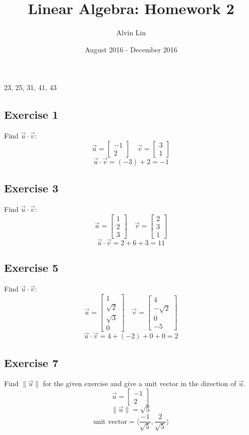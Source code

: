 \documentclass[letterpaper, 12pt]{math}
\title{Linear Algebra: Homework 2}
\author{Alvin Lin}
\date{August 2016 - December 2016}
\begin{document}
\maketitle

23, 25, 31, 41, 43

\subsection*{Exercise 1}
Find \( \vec{u}\cdot\vec{v} \):
\[ \vec{u} = \begin{bmatrix}-1 \\ 2\end{bmatrix} \quad
  \vec{v} = \begin{bmatrix}3 \\ 1\end{bmatrix} \]
\[ \vec{u}\cdot\vec{v} = (-3)+2 = -1 \]

\subsection*{Exercise 3}
Find \( \vec{u}\cdot\vec{v} \):
\[ \vec{u} = \begin{bmatrix}1 \\ 2 \\ 3\end{bmatrix} \quad
  \vec{v} = \begin{bmatrix}2 \\ 3 \\ 1\end{bmatrix} \]
\[ \vec{u}\cdot\vec{v} = 2+6+3 = 11 \]

\subsection*{Exercise 5}
Find \( \vec{u}\cdot\vec{v} \):
\[ \vec{u} = \begin{bmatrix}1 \\ \sqrt{2} \\ \sqrt{3} \\ 0\end{bmatrix} \quad
  \vec{v} = \begin{bmatrix}4 \\ -\sqrt{2} \\ 0 \\ -5\end{bmatrix} \]
\[ \vec{u}\cdot\vec{v} = 4+(-2)+0+0 = 2 \]

\subsection*{Exercise 7}
Find \( \|\vec{u}\| \) for the given exercise and give a unit vector in the
direction of \( \vec{u} \).
\[ \vec{u} = \begin{bmatrix}-1 \\ 2\end{bmatrix} \]
\[ \|\vec{u}\| = \sqrt{5} \]
\[ \text{unit vector} = \langle\frac{-1}{\sqrt{5}},\frac{2}{\sqrt{5}}\rangle \]
\end{document}
